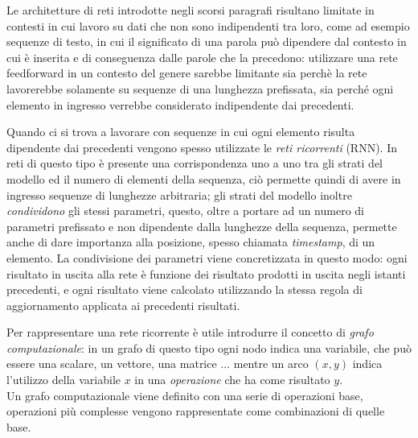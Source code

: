 \documentclass[../../main.tex]{subfiles}
\begin{document}
Le architetture di reti introdotte negli scorsi paragrafi risultano limitate in contesti in cui lavoro su dati che non sono indipendenti tra loro, come ad esempio sequenze di testo, in cui il significato di una parola può dipendere dal contesto in cui è inserita e di conseguenza dalle parole che la precedono: utilizzare una rete feedforward in un contesto del genere sarebbe limitante sia perchè la rete lavorerebbe solamente su sequenze di una lunghezza prefissata, sia perché ogni elemento in ingresso verrebbe considerato indipendente dai precedenti.

Quando ci si trova a lavorare con sequenze in cui ogni elemento risulta dipendente dai precedenti vengono spesso utilizzate le \textit{reti ricorrenti} (RNN). In reti di questo tipo è presente una corrispondenza uno a uno tra gli strati del modello ed il numero di elementi della sequenza, ciò permette quindi di avere in ingresso sequenze di lunghezze arbitraria; gli strati del modello inoltre \textit{condividono} gli stessi parametri, questo, oltre a portare ad un numero di parametri prefissato e non dipendente dalla lunghezze della sequenza, permette anche di dare importanza alla posizione, spesso chiamata \textit{timestamp}, di un elemento. La condivisione dei parametri viene concretizzata in questo modo: ogni risultato in uscita alla rete è funzione dei risultato prodotti in uscita negli istanti precedenti, e ogni risultato viene calcolato utilizzando la stessa regola di aggiornamento applicata ai precedenti risultati.

Per rappresentare una rete ricorrente è utile introdurre il concetto di \textit{grafo computazionale}: in un grafo di questo tipo ogni nodo indica una variabile, che può essere una scalare, un vettore, una matrice $\dots$ mentre un arco $(x,y)$ indica l'utilizzo della variabile $x$ in una \textit{operazione} che ha come risultato $y$.\\
Un grafo computazionale viene definito con una serie di operazioni base, operazioni più complesse vengono rappresentate come combinazioni di quelle base.
\end{document}
